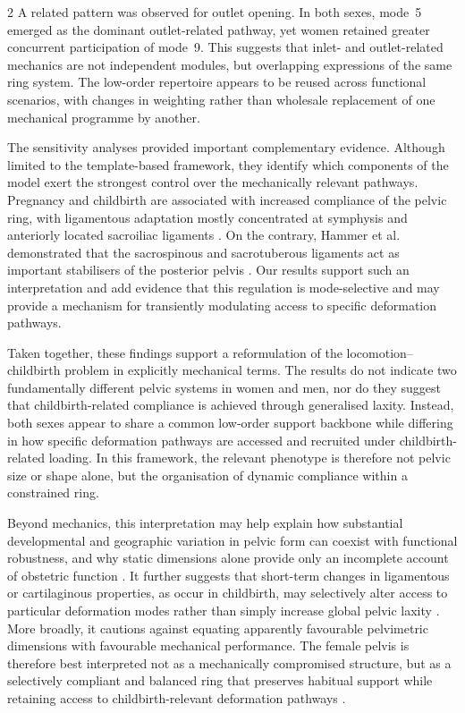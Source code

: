 \documentclass[openacc]{rsproca_new}
\begin{document}
\begin{multicols}{2}
A related pattern was observed for outlet opening. In both sexes, mode~5 emerged as the dominant outlet-related pathway, yet women retained greater concurrent participation of mode~9. This suggests that inlet- and outlet-related mechanics are not independent modules, but overlapping expressions of the same ring system. The low-order repertoire appears to be reused across functional scenarios, with changes in weighting rather than wholesale replacement of one mechanical programme by another.

The sensitivity analyses provided important complementary evidence. Although limited to the template-based framework, they identify which components of the model exert the strongest control over the mechanically relevant pathways. Pregnancy and childbirth are associated with increased compliance of the pelvic ring, with ligamentous adaptation mostly concentrated at symphysis and anteriorly located sacroiliac ligaments \cite{Damen2001, Pires2015, Cicek2015, Fiani2021}. On the contrary, Hammer et al. demonstrated that the sacrospinous and sacrotuberous ligaments act as important stabilisers of the posterior pelvis \cite{Hammer2019}. Our results support such an interpretation and add evidence that this regulation is mode-selective and may provide a mechanism for transiently modulating access to specific deformation pathways.

Taken together, these findings support a reformulation of the locomotion--childbirth problem in explicitly mechanical terms. The results do not indicate two fundamentally different pelvic systems in women and men, nor do they suggest that childbirth-related compliance is achieved through generalised laxity. Instead, both sexes appear to share a common low-order support backbone while differing in how specific deformation pathways are accessed and recruited under childbirth-related loading. In this framework, the relevant phenotype is therefore not pelvic size or shape alone, but the organisation of dynamic compliance within a constrained ring.

Beyond mechanics, this interpretation may help explain how substantial developmental and geographic variation in pelvic form can coexist with functional robustness, and why static dimensions alone provide only an incomplete account of obstetric function \cite{BettiManica2018,Auerbach2018,VerbruggenNowlan2017,Novak2020,KurkiDecrausaz2015}. It further suggests that short-term changes in ligamentous or cartilaginous properties, as occur in childbirth, may selectively alter access to particular deformation modes rather than simply increase global pelvic laxity \cite{Vleeming2012,Kiapour2019,Stolarczyk2021}. More broadly, it cautions against equating apparently favourable pelvimetric dimensions with favourable mechanical performance. The female pelvis is therefore best interpreted not as a mechanically compromised structure, but as a selectively compliant and balanced ring that preserves habitual support while retaining access to childbirth-relevant deformation pathways \cite{Pavlicev2020,Haeusler2021,Grunstra2023,Warrener2015}.



\end{multicols}
\end{document}
